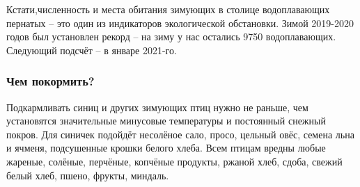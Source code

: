 Кстати,численность и места обитания зимующих в столице водоплавающих пернатых –
это один из индикаторов экологической обстановки. Зимой 2019-2020 годов был
установлен рекорд – на зиму у нас остались 9750 водоплавающих. Следующий
подсчёт – в январе 2021-го.

\subsubsection{Чем покормить?}

Подкармливать синиц и других зимующих птиц нужно не раньше, чем установятся
значительные минусовые температуры и постоянный снежный покров. Для синичек
подойдёт несолёное сало, просо, цельный овёс, семена льна и ячменя, подсушенные
крошки белого хлеба. Всем птицам вредны любые жареные, солёные, перчёные,
копчёные продукты, ржаной хлеб, сдоба, свежий белый хлеб, пшено, фрукты,
миндаль.

